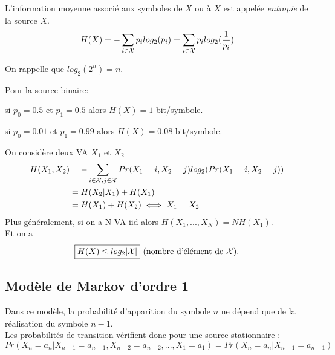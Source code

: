 \documentclass[main.tex]{subfiles}
\begin{document}
\begin{defin}
L'information moyenne associé aux symboles de $X$ ou à $X$ est appelée \emph{entropie} de la source $X$.
 \[H(X) = -\sum_{i\in\mathcal{X}}p_i log_2(p_i) = \sum_{i\in\mathcal{X}}p_i log_2(\frac{1}{p_i})\]
\end{defin}


On rappelle que $log_2(2^n)=n$.

\begin{example}
 Pour la source binaire:

 si $p_0 = 0.5$ et $p_1 = 0.5$ alors $H(X) = 1$ bit/symbole.

 si $p_0 = 0.01$ et $p_1 = 0.99$ alors $H(X) = 0.08$ bit/symbole.
\end{example}

\begin{prop}

On considère deux VA $X_1$ et $X_2$
\begin{align*}
H(X_1,X_2) &= - \sum_{i\in \mathcal{X}, j \in \mathcal{X}} Pr(X_1=i,X_2=j)log_2(Pr(X_1=i,X_2=j))\\
&= H(X_2|X_1)+H(X_1)\\
           &= H(X_1)+H(X_2) \iff X_1 \perp X_2
\end{align*}
Plus généralement, si on a N VA iid alors $H(X_1,...,X_N) = N H(X_1)$.\\
Et on a
\[\boxed{H(X) \leq log_2|\mathcal{X}|}\text{ (nombre d'élément de $\mathcal{X}$).}\]
\end{prop}

\subsection{Modèle de Markov d'ordre 1}

\noindent Dans ce modèle, la probabilité d'apparition du symbole $n$ ne dépend que de la réalisation du symbole $n-1$. \\

Les probabilités de transition vérifient donc pour une source stationnaire :
\[Pr(X_n=a_n|X_{n-1} = a_{n-1},X_{n-2} = a_{n-2},...,X_{1} = a_{1}) = Pr(X_n = a_n |X_{n-1} = a_{n-1})\]
\end{document}
